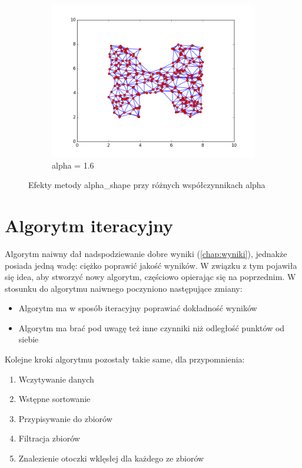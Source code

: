 \begin{figure}[h!]
\begin{subfigure}[b]{0.33\textwidth}
		\includegraphics[width=\linewidth]{img/triangulacja3.png}
		\caption {alpha = 1.6}
	\end{subfigure}
    \caption{Efekty metody alpha\_shape przy różnych współczynnikach alpha}
    \label{fig:triangulacja_alpha}
\end{figure}

\section{Algorytm iteracyjny}

Algorytm naiwny dał nadspodziewanie dobre wyniki (\autoref{chap:wyniki}), jednakże posiada jedną wadę:
ciężko poprawić jakość wyników. W związku z tym pojawiła się idea, aby stworzyć nowy algorytm, częściowo
opierając się na poprzednim. W stosunku do algorytmu naiwnego poczyniono następujące zmiany:
\begin{itemize}
    \item Algorytm ma w sposób iteracyjny poprawiać dokładność wyników
    \item Algorytm ma brać pod uwagę też inne czynniki niż odległość punktów od siebie
\end{itemize}

\noindent Kolejne kroki algorytmu pozostały takie same, dla przypomnienia:
\begin{enumerate}
    \item Wczytywanie danych
    \item Wstępne sortowanie
    \item Przypisywanie do zbiorów
    \item Filtracja zbiorów
    \item Znalezienie otoczki wklęsłej dla każdego ze zbiorów
\end{enumerate}

